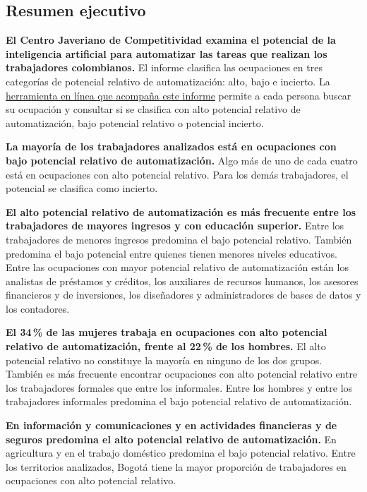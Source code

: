 \documentclass[12pt, a4paper]{article}
\begin{document}
\begin{mdframed}[
  linewidth=1pt,
  linecolor=gray!60,
  backgroundcolor=gray!6,
  innertopmargin=12pt,
  innerbottommargin=12pt,
  innerleftmargin=14pt,
  innerrightmargin=14pt
]
\section*{Resumen ejecutivo}

\textbf{El Centro Javeriano de Competitividad examina el potencial de la inteligencia artificial para automatizar las tareas que realizan los trabajadores colombianos.} El informe clasifica las ocupaciones en tres categorías de potencial relativo de automatización: alto, bajo e incierto. La \href{https://kin-george.github.io/CJC-Interactividad03/}{herramienta en línea que acompaña este informe} permite a cada persona buscar su ocupación y consultar si se clasifica con alto potencial relativo de automatización, bajo potencial relativo o potencial incierto.

\textbf{La mayoría de los trabajadores analizados está en ocupaciones con bajo potencial relativo de automatización.} Algo más de uno de cada cuatro está en ocupaciones con alto potencial relativo. Para los demás trabajadores, el potencial se clasifica como incierto.

\textbf{El alto potencial relativo de automatización es más frecuente entre los trabajadores de mayores ingresos y con educación superior.} Entre los trabajadores de menores ingresos predomina el bajo potencial relativo. También predomina el bajo potencial entre quienes tienen menores niveles educativos. Entre las ocupaciones con mayor potencial relativo de automatización están los analistas de préstamos y créditos, los auxiliares de recursos humanos, los asesores financieros y de inversiones, los diseñadores y administradores de bases de datos y los contadores.

\textbf{El 34\,\% de las mujeres trabaja en ocupaciones con alto potencial relativo de automatización, frente al 22\,\% de los hombres.} El alto potencial relativo no constituye la mayoría en ninguno de los dos grupos. También es más frecuente encontrar ocupaciones con alto potencial relativo entre los trabajadores formales que entre los informales. Entre los hombres y entre los trabajadores informales predomina el bajo potencial relativo de automatización.

\textbf{En información y comunicaciones y en actividades financieras y de seguros predomina el alto potencial relativo de automatización.} En agricultura y en el trabajo doméstico predomina el bajo potencial relativo. Entre los territorios analizados, Bogotá tiene la mayor proporción de trabajadores en ocupaciones con alto potencial relativo.


\end{mdframed}
\end{document}

